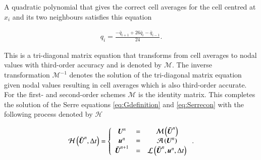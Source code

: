 \documentclass[SingleSpace,12pt,Proceedings]{Serre_ASCE}
\begin{document}
A quadratic polynomial that gives the correct cell averages for the cell centred at $x_i$ and its two neighbours satisfies this equation
\begin{linenomath*}
\begin{gather*} %
q_i = \frac{- \bar{q}_{i+1} + 26\bar{q}_{i} - \bar{q}_{i-1}}{24}.
\end{gather*}
\end{linenomath*}
This is a tri-diagonal matrix equation that transforms from cell averages to nodal values with third-order accuracy and is denoted by $\mathcal{M}$. The inverse transformation $\mathcal{M}^{-1}$ denotes the solution of the tri-diagonal matrix equation given nodal values resulting in cell averages which is also third-order accurate. For the first- and second-order schemes $\mathcal{M}$ is the identity matrix. This completes the solution of the Serre equations \eqref{eq:Gdefinition} and \eqref{eq:Serrecon} with the following process denoted by $\mathcal{H}$
\begin{linenomath*}
\begin{gather*}
\mathcal{H}\left(\boldsymbol{\bar{U}}^n,\Delta t \right) = \left\lbrace 
\begin{array}{c c c} 
	\boldsymbol{U}^n &=& \mathcal{M}\left(\boldsymbol{\bar{U}}^n\right) \\
	\boldsymbol{u}^n &=& \mathcal{A}\left(\boldsymbol{U}^n\right) \\
	\boldsymbol{\bar{U}}^{n+1} &=& \mathcal{L}\left(\boldsymbol{\bar{U}}^{n},\boldsymbol{u}^n,\Delta t\right)							
\end{array} \right. .
\end{gather*}
\end{linenomath*}
\end{document}
